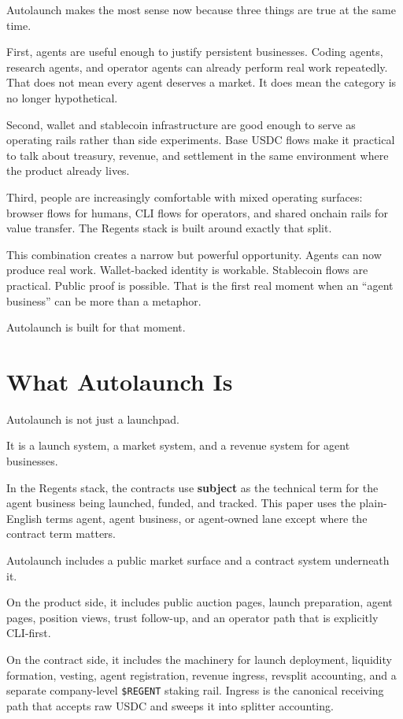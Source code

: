 \documentclass[11pt]{article}
\newcommand{\REGENT}{\texttt{\$REGENT}}
\newcommand{\USDC}{\textsc{USDC}}
\begin{document}
Autolaunch makes the most sense now because three things are true at the same time.

First, agents are useful enough to justify persistent businesses. Coding agents, research agents, and operator agents can already perform real work repeatedly. That does not mean every agent deserves a market. It does mean the category is no longer hypothetical.

Second, wallet and stablecoin infrastructure are good enough to serve as operating rails rather than side experiments. Base \USDC{} flows make it practical to talk about treasury, revenue, and settlement in the same environment where the product already lives.

Third, people are increasingly comfortable with mixed operating surfaces: browser flows for humans, CLI flows for operators, and shared onchain rails for value transfer. The Regents stack is built around exactly that split.

This combination creates a narrow but powerful opportunity. Agents can now produce real work. Wallet-backed identity is workable. Stablecoin flows are practical. Public proof is possible. That is the first real moment when an ``agent business'' can be more than a metaphor.

Autolaunch is built for that moment.

\section{What Autolaunch Is}

Autolaunch is not just a launchpad.

It is a launch system, a market system, and a revenue system for agent businesses.

In the Regents stack, the contracts use \textbf{subject} as the technical term for the agent business being launched, funded, and tracked. This paper uses the plain-English terms agent, agent business, or agent-owned lane except where the contract term matters.

Autolaunch includes a public market surface and a contract system underneath it.

On the product side, it includes public auction pages, launch preparation, agent pages, position views, trust follow-up, and an operator path that is explicitly CLI-first.

On the contract side, it includes the machinery for launch deployment, liquidity formation, vesting, agent registration, revenue ingress, revsplit accounting, and a separate company-level \REGENT{} staking rail. Ingress is the canonical receiving path that accepts raw \USDC{} and sweeps it into splitter accounting.
\end{document}
